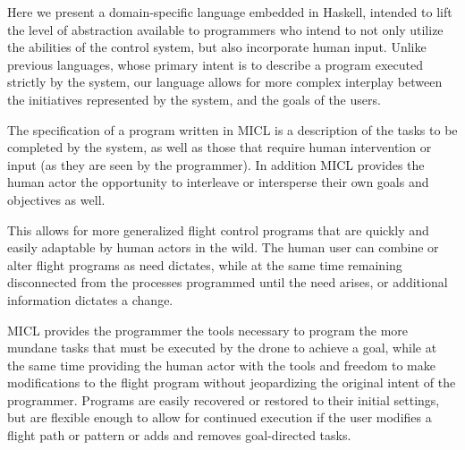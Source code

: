 \documentclass{sig-alternate-05-2015}
\begin{document}
Here we present a domain-specific language embedded in Haskell, intended to
lift the level of abstraction available to programmers who intend to not only
utilize the abilities of the control system, but also incorporate human
input. Unlike previous languages, whose primary intent is to describe a
program executed strictly by the system, our language allows for more complex
interplay between the initiatives represented by the system, and the goals
of the users.

The specification of a program written in MICL is a description of the
tasks to be completed by the system, as well as those that require human
intervention or input (as they are seen by the programmer). In addition
MICL provides the human actor the opportunity to interleave or
intersperse their own goals and objectives as well.



This allows for more generalized flight control programs that are quickly and
easily adaptable by human actors in the wild. The human user can combine or
alter flight programs as need dictates, while at the same time remaining
disconnected from the processes programmed until the need arises, or
additional information dictates a change.

MICL provides the programmer the tools necessary to program the more mundane
tasks that must be executed by the drone to achieve a goal, while at the same
time providing the human actor with the tools and freedom to make
modifications to the flight program without jeopardizing the original intent
of the programmer. Programs are easily recovered or restored to their initial
settings, but are flexible enough to allow for continued execution if the user
modifies a flight path or pattern or adds and removes goal-directed tasks.
\end{document}
